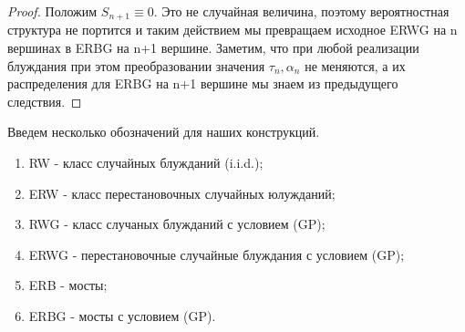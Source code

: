 \documentclass[12pt,a4paper]{article} %
\begin{document}
	\begin{proof}
		Положим $S_{n+1}\equiv0$. Это не случайная величина, поэтому вероятностная структура не портится и таким действием мы превращаем исходное ERWG на n вершинах в ERBG на n+1 вершине. Заметим, что при любой реализации блуждания при этом преобразовании значения $\tau_n,\alpha_n$ не меняются, а их распределения для ERBG на n+1 вершине мы знаем из предыдущего следствия.
	\end{proof}
	Введем несколько обозначений для наших конструкций.
	\begin{enumerate}
		\item RW - класс случайных блужданий (i.i.d.);
		\item ERW - класс перестановочных случайных юлужданий;
		\item RWG - класс случаных блужданий с условием (GP);
		\item ERWG - перестановочные случайные блуждания с условием (GP);
		\item ERB - мосты;
		\item ERBG - мосты с условием (GP).
	\end{enumerate}
\end{document}
